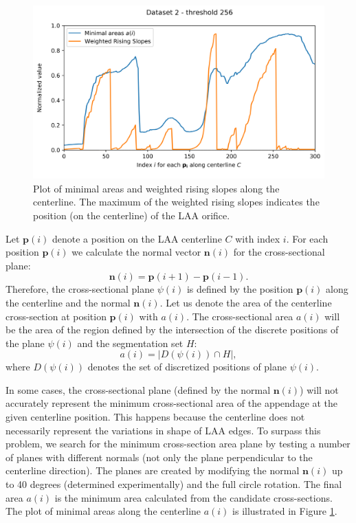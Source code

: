 \documentclass[review]{elsarticle}
\begin{document}
\begin{figure}[t]
  \centering
  \includegraphics[width=1\linewidth]{fig9.png}
  \caption{Plot of minimal areas and weighted rising slopes along the
    centerline. The maximum of the weighted rising slopes indicates the position
  (on the centerline) of the LAA orifice. }
  \label{fig:minimal_areas_plot}  
\end{figure}



Let $\mathbf{p}(i)$ denote a position on the LAA centerline $C$ with index $i$.
For each position $\mathbf{p}(i)$ we calculate the normal vector
$\mathbf{n}(i)$ for the cross-sectional plane:
\begin{equation}
  \label{eq:normal}
  \mathbf{n}(i) = \mathbf{p}(i+1) - \mathbf{p}(i-1) .
\end{equation}
Therefore, the cross-sectional plane $\psi(i)$ is defined by the position
$\mathbf{p}(i)$ along the centerline and the normal $\mathbf{n}(i)$.  Let us
denote the area of the centerline cross-section at position $\mathbf{p}(i)$
with $a(i)$. The cross-sectional area $a(i)$ will be the area of the region
defined by the intersection of the discrete positions of the plane $\psi(i)$
and the segmentation set $H$:
\begin{equation}
  \label{eq:area}
  a(i) = | D(\psi(i)) \cap H |,
\end{equation}
where $D(\psi(i))$ denotes the set of discretized positions of plane $\psi(i)$.


In some cases, the cross-sectional plane (defined by the normal
$\mathbf{n}(i)$) will not accurately represent the minimum cross-sectional area
of the appendage at the given centerline position. This happens because the
centerline does not necessarily represent the variations in shape of LAA edges.
To surpass this problem, we search for the minimum cross-section area plane by
testing a number of planes with different normals (not only the plane
perpendicular to the centerline direction). The planes are created by modifying
the normal $\mathbf{n}(i)$ up to 40 degrees (determined experimentally) and the
full circle rotation. The final area $a(i)$ is the minimum area calculated from
the candidate cross-sections.
The plot of minimal areas along the centerline $a(i)$ is illustrated in Figure
\ref{fig:minimal_areas_plot}.
\end{document}
